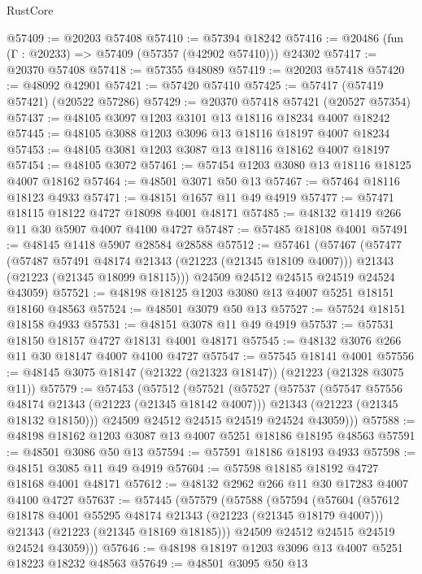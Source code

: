 \begin{lexlean}{RustCore}
\begin{coremodule}
@57409 := @20203 @57408
@57410 := @57394 @18242
@57416 := @20486 (fun (Γ : @20233) => @57409 (@57357 (@42902 @57410))) @24302
@57417 := @20370 @57408
@57418 := @57355 @48089
@57419 := @20203 @57418
@57420 := @48092 @42901
@57421 := @57420 @57410
@57425 := @57417 (@57419 @57421) (@20522 @57286)
@57429 := @20370 @57418 @57421 (@20527 @57354)
@57437 := @48105 @3097 @1203 @3101 @13 @18116 @18234 @4007 @18242
@57445 := @48105 @3088 @1203 @3096 @13 @18116 @18197 @4007 @18234
@57453 := @48105 @3081 @1203 @3087 @13 @18116 @18162 @4007 @18197
@57454 := @48105 @3072
@57461 := @57454 @1203 @3080 @13 @18116 @18125 @4007 @18162
@57464 := @48501 @3071 @50 @13
@57467 := @57464 @18116 @18123 @4933
@57471 := @48151 @1657 @11 @49 @4919
@57477 := @57471 @18115 @18122 @4727 @18098 @4001 @48171
@57485 := @48132 @1419 @266 @11 @30 @5907 @4007 @4100 @4727
@57487 := @57485 @18108 @4001
@57491 := @48145 @1418 @5907 @28584 @28588
@57512 := @57461
    (@57467
      (@57477
        (@57487 @57491 @48174 @21343 (@21223 (@21345 @18109 @4007)))
        @21343
        (@21223 (@21345 @18099 @18115)))
      @24509
      @24512
      @24515
      @24519
      @24524
      @43059)
@57521 := @48198 @18125 @1203 @3080 @13 @4007 @5251 @18151 @18160 @48563
@57524 := @48501 @3079 @50 @13
@57527 := @57524 @18151 @18158 @4933
@57531 := @48151 @3078 @11 @49 @4919
@57537 := @57531 @18150 @18157 @4727 @18131 @4001 @48171
@57545 := @48132 @3076 @266 @11 @30 @18147 @4007 @4100 @4727
@57547 := @57545 @18141 @4001
@57556 := @48145 @3075 @18147 (@21322 (@21323 @18147)) (@21223 (@21328 @3075 @11))
@57579 := @57453
    (@57512
      (@57521
        (@57527
          (@57537
            (@57547 @57556 @48174 @21343 (@21223 (@21345 @18142 @4007)))
            @21343
            (@21223 (@21345 @18132 @18150)))
          @24509
          @24512
          @24515
          @24519
          @24524
          @43059)))
@57588 := @48198 @18162 @1203 @3087 @13 @4007 @5251 @18186 @18195 @48563
@57591 := @48501 @3086 @50 @13
@57594 := @57591 @18186 @18193 @4933
@57598 := @48151 @3085 @11 @49 @4919
@57604 := @57598 @18185 @18192 @4727 @18168 @4001 @48171
@57612 := @48132 @2962 @266 @11 @30 @17283 @4007 @4100 @4727
@57637 := @57445
    (@57579
      (@57588
        (@57594
          (@57604
            (@57612 @18178 @4001 @55295 @48174 @21343 (@21223 (@21345 @18179 @4007)))
            @21343
            (@21223 (@21345 @18169 @18185)))
          @24509
          @24512
          @24515
          @24519
          @24524
          @43059)))
@57646 := @48198 @18197 @1203 @3096 @13 @4007 @5251 @18223 @18232 @48563
@57649 := @48501 @3095 @50 @13

\end{coremodule}
\end{lexlean}

